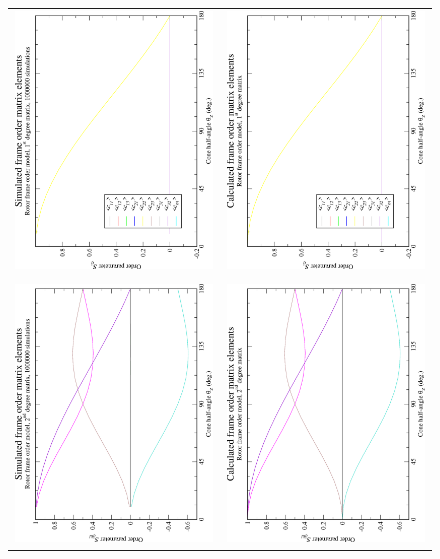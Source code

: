 \begin{figure}
\centering
  \begin{tabular}{@{}cc@{}}
    \includegraphics[width=.35\textwidth,angle=270]{images/frame_order_matrix/Sij_rotor_in_frame_theta_z_ens1000000.eps} &
    \includegraphics[width=.35\textwidth,angle=270]{images/frame_order_matrix/Sij_rotor_in_frame_theta_z_calc.eps} \\
    \\[-5pt]
    \includegraphics[width=.35\textwidth,angle=270]{images/frame_order_matrix/Sijkl_rotor_in_frame_theta_z_ens1000000.eps} &
    \includegraphics[width=.35\textwidth,angle=270]{images/frame_order_matrix/Sijkl_rotor_in_frame_theta_z_calc.eps} \\

\end{tabular}
\end{figure}
